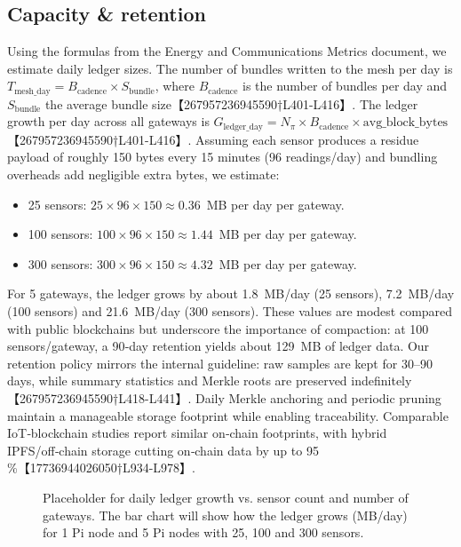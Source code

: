 \documentclass[12pt,onecolumn]{IEEEtran} %
\begin{document}
\subsection{Capacity \& retention}
\label{sec:capacity-retention}
Using the formulas from the Energy and Communications Metrics document, we estimate daily ledger sizes.  The number of bundles written to the mesh per day is $T_{\text{mesh\_day}} = B_{\text{cadence}} \times S_{\text{bundle}}$, where $B_{\text{cadence}}$ is the number of bundles per day and $S_{\text{bundle}}$ the average bundle size【267957236945590†L401-L416】.  The ledger growth per day across all gateways is $G_{\text{ledger\_day}} = N_{\pi} \times B_{\text{cadence}} \times \text{avg\_block\_bytes}$【267957236945590†L401-L416】.  Assuming each sensor produces a residue payload of roughly 150 bytes every 15 minutes (96 readings/day) and bundling overheads add negligible extra bytes, we estimate:
\begin{itemize}
  \item 25 sensors: $25 \times 96 \times 150 \approx 0.36$~MB per day per gateway.
  \item 100 sensors: $100 \times 96 \times 150 \approx 1.44$~MB per day per gateway.
  \item 300 sensors: $300 \times 96 \times 150 \approx 4.32$~MB per day per gateway.
\end{itemize}
For 5 gateways, the ledger grows by about 1.8~MB/day (25 sensors), 7.2~MB/day (100 sensors) and 21.6~MB/day (300 sensors).  These values are modest compared with public blockchains but underscore the importance of compaction: at 100 sensors/gateway, a 90‑day retention yields about 129~MB of ledger data.  Our retention policy mirrors the internal guideline: raw samples are kept for 30–90 days, while summary statistics and Merkle roots are preserved indefinitely【267957236945590†L418-L441】.  Daily Merkle anchoring and periodic pruning maintain a manageable storage footprint while enabling traceability.  Comparable IoT‑blockchain studies report similar on‑chain footprints, with hybrid IPFS/off‑chain storage cutting on‑chain data by up to 95 \%【17736944026050†L934-L978】.

\begin{figure}[!t]
  \centering
  \fbox{\rule{0pt}{1.5in}\rule{0.95\linewidth}{0pt}} %
  \caption{Placeholder for daily ledger growth vs. sensor count and number of gateways.  The bar chart will show how the ledger grows (MB/day) for 1 Pi node and 5 Pi nodes with 25, 100 and 300 sensors.}
  \label{fig:capacity-growth}
\end{figure}
\end{document}
